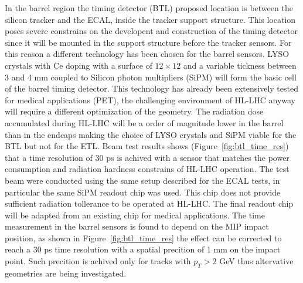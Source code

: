 In the barrel region the timing detector (BTL) proposed location is between the silicon tracker and the ECAL, inside the
tracker support structure. This location poses severe constrains on the developent and construction of the
timing detector since it will be mounted in the support structure before the tracker sensors. For this reason a
different technology has been chosen for the barrel sensors. LYSO crystals with Ce doping
with a surface of $12\times 12$ and a variable tickness between 3 and 4 mm coupled to Silicon photon multipliers (SiPM)
will form the basic cell of the barrel timing detector. This technology has already been extensively tested
for medical applications (PET), the challenging environment of HL-LHC anyway will require a different optimization
of the geometry. The radiation dose accumulated during HL-LHC will be a order of magnitude lower in the barrel than
in the endcaps making the choice of LYSO crystals and SiPM viable for the BTL but not for the ETL.
Beam test results shows (Figure~\ref{fig:btl_time_res}) that a time resolution of 30 ps is achived with
a sensor that matches the power consumption and radiation hardness constrains of HL-LHC operation. The test beam
were conducted using the same setup described for the ECAL tests, in particular the same SiPM readout chip was used.
This chip does not provide sufficient radiation tollerance to be operated at HL-LHC. The final readout chip
will be adapted from an existing chip for medical applications.
The time measurement in the barrel sensors is found to depend on the MIP impact position, as shown in Figure~\ref{fig:btl_time_res}
the effect can be corrected to reach a 30 ps time resolution with a spatial precition of 1 mm on the impact point.
Such precition is achived only for tracks with $p_T > 2$ GeV thus altervative geometries are being investigated.

